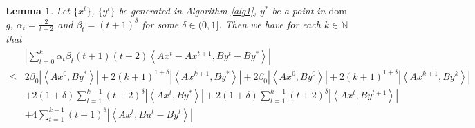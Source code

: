 \documentclass{article}
\numberwithin{equation}{section}
\newtheorem{lemma}{Lemma}[section]
\begin{document}
\begin{lemma} \label{lemma_of_sum_Axk-Axk+1}
    Let  $\{x^t\}$, $\{y^t\}$ be generated in Algorithm \ref{alg1}, $y^*$ be a point 
    in $\mathrm{dom}$g, $\alpha_t = \frac{2}{t+2}$ and $\beta_{t} =(t+1)^{\delta}$ for some $\delta \in (0,1]$. 
    Then we have for each $k\in\mathbb{N}$ that  
    \begin{align}
        &\left| \sum\limits_{t = 0}^k\alpha_t\beta_{t}(t+1)(t+2)\left\langle Ax^t- Ax^{t+1},By^t-By^* \right\rangle \right| \nonumber \\
        \leq& 2 \beta_0 \left|\left\langle Ax^0, By^* \right\rangle \right|
        + 2(k+1)^{1+\delta} \left|\left\langle  Ax^{k+1},By^* \right\rangle\right|
        +2 \beta_0 \left| \left\langle Ax^0, By^0 \right\rangle \right|
        + 2(k+1)^{1+\delta} \left| \left\langle  Ax^{k+1},By^k \right\rangle\right| \nonumber \\
        &+ 2(1+\delta) \sum\limits_{t=1}^{k-1} (t+2)^{\delta} \left|\left\langle Ax^t, By^* \right\rangle\right|
        + 2(1+\delta) \sum\limits_{t=1}^{k-1} (t+2)^{\delta} \left| \left\langle Ax^t, By^{t+1} \right\rangle\right| \nonumber \\
        &+ 4 \sum\limits_{t=1}^{k-1}  (t+1)^{\delta} \left| \left\langle Ax^t, Bu^t-By^t \right\rangle \right|
    \end{align}
\end{lemma}
\end{document}
